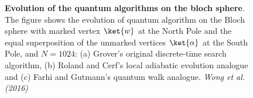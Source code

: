 \begin{figure}[h]
     \centering
     \caption[Evolution of the quantum algorithms on the bloch sphere]{\textbf{Evolution of the quantum algorithms on the bloch sphere}. The figure shows the evolution of quantum algorithm on the Bloch sphere with marked vertex $\ket{w}$ at the North Pole and the equal superposition of the unmarked vertices $\ket{\alpha}$ at the South Pole, and $N=1024$: (a) Grover's original discrete-time search algorithm, (b) Roland and Cerf's local adiabatic evolution analogue and (c) Farhi and Gutmann's quantum walk analogue. \textit{Wong et al. (2016)} \cite{Wong2016}}
     \label{fig:blochsphere}
\end{figure}

